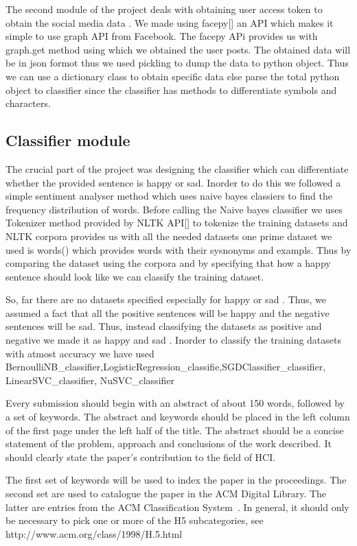 \documentclass{chi2009}
\begin{document}
\begin{Abstract}
The second module of the project deals with obtaining user access token to obtain the social media data . We made using facepy[] an API which makes it simple to use graph API from Facebook. The facepy APi provides us with graph.get method using which we obtained the user posts. The obtained data will be in json formot thus we used pickling to dump the data to python object. Thus we can use a dictionary class to obtain specific data else parse the total python object to classifier since the classifier has methods to differentiate symbols and characters.  




\subsection{Classifier module}

The crucial part of the project was designing the classifier which can differentiate whether the provided sentence is happy or sad. Inorder to do this we followed a simple sentiment analyser method which uses naive bayes classiers to find the frequency distribution of words. Before calling the Naive bayes classifier we uses Tokenizer method provided by NLTK API[] to tokenize the training datasets and NLTK corpora provides us with all the needed datasets one prime dataset we used is words() which provides words with their sysnonyms and exampls. Thus by comparing the dataset using the corpora and by specifying that how a happy sentence should look like we can classify the training dataset. 

So, far there are no datasets specified especially for happy or sad . Thus, we assumed a fact that all the positive sentences will be happy and the negative sentences will be sad. Thus, instead classifying the datasets as positive and negative we made it as happy and sad . Inorder to classify the training datasets with atmost accuracy we have used BernoulliNB_classifier,LogisticRegression_classifie,SGDClassifier_classifier, LinearSVC_classifier, NuSVC_classifier




Every submission should begin with an abstract of about 150 words,
followed by a set of keywords. The abstract and keywords should be
placed in the left column of the first page under the left half of the
title. The abstract should be a concise statement of the problem,
approach and conclusions of the work described.  It should clearly
state the paper's contribution to the field of HCI.

The first set of keywords will be used to index the paper in the
proceedings. The second set are used to catalogue the paper in the ACM
Digital Library. The latter are entries from the ACM Classification
System~\cite{acm_categories}.  In general, it should only be necessary
to pick one or more of the H5 subcategories, see
http://www.acm.org/class/1998/H.5.html


\end{Abstract}
\end{document}
